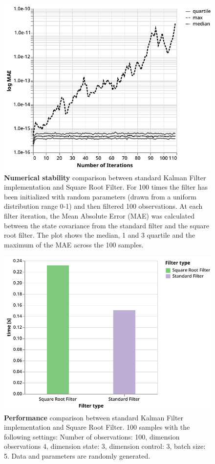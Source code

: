 \documentclass{article}
\begin{document}
\begin{figure}[H]
\includegraphics[width=\textwidth]{numerical_stability}
 \caption{\textbf{Numerical stability} comparison between standard Kalman Filter implementation and Square Root Filter. For 100 times the filter has been initialized with random parameters (drawn from a uniform distribution range 0-1) and then filtered 100 observations. At each filter iteration, the Mean Absolute Error (MAE) was calculated between the state covariance from the standard filter and the square root filter. The plot shows the median, 1 and 3 quartile and the maximum of the MAE across the 100 samples.}
 \label{fig:num_stab}
\end{figure}

\begin{figure}
\includegraphics[width=\textwidth]{perf_sr}
 \caption{\textbf{Performance} comparison between standard Kalman Filter implementation and Square Root Filter. 100 samples with the following settings: Number of observations: 100, dimension observations 4, dimension state: 3, dimension control: 3, batch size: 5. Data and parameters are randomly generated.}
 \label{fig:num_stab_perf}
\end{figure}
\end{document}
